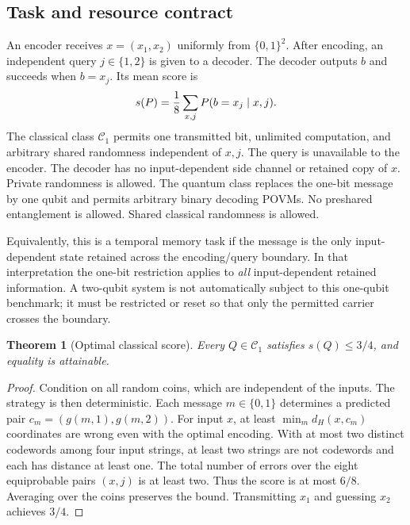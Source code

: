 \documentclass[11pt,a4paper]{article}
\newtheorem{theorem}{Theorem}[section]
\theoremstyle{definition}
\begin{document}
\subsection{Task and resource contract}
An encoder receives $x=(x_1,x_2)$ uniformly from $\{0,1\}^2$. After encoding, an independent query $j\in\{1,2\}$ is given to a decoder. The decoder outputs $b$ and succeeds when $b=x_j$. Its mean score is
\[
 s(P)={1\over8}\sum_{x,j}P(b=x_j\mid x,j).
\]
The classical class $\mathcal C_1$ permits one transmitted bit, unlimited computation, and arbitrary shared randomness independent of $x,j$. The query is unavailable to the encoder. The decoder has no input-dependent side channel or retained copy of $x$. Private randomness is allowed. The quantum class replaces the one-bit message by one qubit and permits arbitrary binary decoding POVMs. No preshared entanglement is allowed. Shared classical randomness is allowed.

Equivalently, this is a temporal memory task if the message is the only input-dependent state retained across the encoding/query boundary. In that interpretation the one-bit restriction applies to \emph{all} input-dependent retained information. A two-qubit system is not automatically subject to this one-qubit benchmark; it must be restricted or reset so that only the permitted carrier crosses the boundary.

\begin{theorem}[Optimal classical score]\label{thm:classical}
Every $Q\in\mathcal C_1$ satisfies $s(Q)\le3/4$, and equality is attainable.
\end{theorem}
\begin{proof}
Condition on all random coins, which are independent of the inputs. The strategy is then deterministic. Each message $m\in\{0,1\}$ determines a predicted pair $c_m=(g(m,1),g(m,2))$. For input $x$, at least $\min_m d_H(x,c_m)$ coordinates are wrong even with the optimal encoding. With at most two distinct codewords among four input strings, at least two strings are not codewords and each has distance at least one. The total number of errors over the eight equiprobable pairs $(x,j)$ is at least two. Thus the score is at most $6/8$. Averaging over the coins preserves the bound. Transmitting $x_1$ and guessing $x_2$ achieves $3/4$.
\end{proof}
\end{document}
